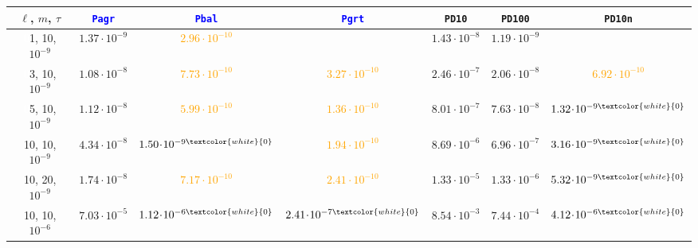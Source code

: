 \documentclass[hidelinks,onefignum,onetabnum]{siamart250211}
\newcommand{\sPbal}{\texttt{Pbal}\xspace}
\newcommand{\sPagr}{\texttt{Pagr}\xspace}
\newcommand{\sPgrt}{\texttt{Pgrt}\xspace}
\newcommand{\sPdten}{\texttt{PD10}\xspace}
\newcommand{\sPdhun}{\texttt{PD100}\xspace}
\newcommand{\sPdnorm}{\texttt{PD10n}\xspace}
\begin{document}
\begin{table}[H]
    \centering
    \footnotesize
    \begin{tabular}{c|ccc|ccc}
        \toprule
        $\ell$, $m$, $\tau$                  & \textcolor{blue}{\sPagr} & \textcolor{blue}{\sPbal}             & \textcolor{blue}{\sPgrt}                                  & \sPdten            & \sPdhun           & \sPdnorm                             \\
        \midrule
        \textcolor{white}{0}1, 10, $10^{-9}$ & $1.37 \!\cdot\! 10^{-9}$        & \textcolor{orange}{$2.96 \!\cdot\! 10^{-10}$} &  & $1.43 \!\cdot\! 10^{-8}$ & $1.19 \!\cdot\! 10^{-9}$ &  \\
        \textcolor{white}{0}3, 10, $10^{-9}$ & $1.08 \!\cdot\! 10^{-8}$        & \textcolor{orange}{$7.73 \!\cdot\! 10^{-10}$}                    & \textcolor{orange}{$3.27 \!\cdot\! 10^{-10}$}                    & $2.46 \!\cdot\! 10^{-7}$ & $2.06 \!\cdot\! 10^{-8}$ & \textcolor{orange}{$6.92 \!\cdot\! 10^{-10}$}                    \\
        \textcolor{white}{0}5, 10, $10^{-9}$ & $1.12 \!\cdot\! 10^{-8}$        & \textcolor{orange}{$5.99 \!\cdot\! 10^{-10}$}                    & \textcolor{orange}{$1.36 \!\cdot\! 10^{-10}$}                    & $8.01 \!\cdot\! 10^{-7}$ & $7.63 \!\cdot\! 10^{-8}$ & \textcolor{orange}{$1.32 \!\cdot\! 10^{-9\textcolor{white}{0}}$} \\
        \midrule
        10, 10, $10^{-9}$                    & $4.34 \!\cdot\! 10^{-8}$        & \textcolor{orange}{$1.50 \!\cdot\! 10^{-9\textcolor{white}{0}}$} & \textcolor{orange}{$1.94 \!\cdot\! 10^{-10}$}                    & $8.69 \!\cdot\! 10^{-6}$ & $6.96 \!\cdot\! 10^{-7}$ & \textcolor{orange}{$3.16 \!\cdot\! 10^{-9\textcolor{white}{0}}$} \\
        10, 20, $10^{-9}$                    & $1.74 \!\cdot\! 10^{-8}$        & \textcolor{orange}{$7.17 \!\cdot\! 10^{-10}$}                    & \textcolor{orange}{$2.41 \!\cdot\! 10^{-10}$}                    & $1.33 \!\cdot\! 10^{-5}$ & $1.33 \!\cdot\! 10^{-6}$ & \textcolor{orange}{$5.32 \!\cdot\! 10^{-9\textcolor{white}{0}}$} \\
        \midrule
        10, 10, $10^{-6}$                    & $7.03 \!\cdot\! 10^{-5}$        & \textcolor{orange}{$1.12 \!\cdot\! 10^{-6\textcolor{white}{0}}$} & \textcolor{orange}{$2.41 \!\cdot\! 10^{-7\textcolor{white}{0}}$} & $8.54 \!\cdot\! 10^{-3}$ & $7.44 \!\cdot\! 10^{-4}$ & \textcolor{orange}{$4.12 \!\cdot\! 10^{-6\textcolor{white}{0}}$} \\

\end{tabular}
\end{table}
\end{document}
